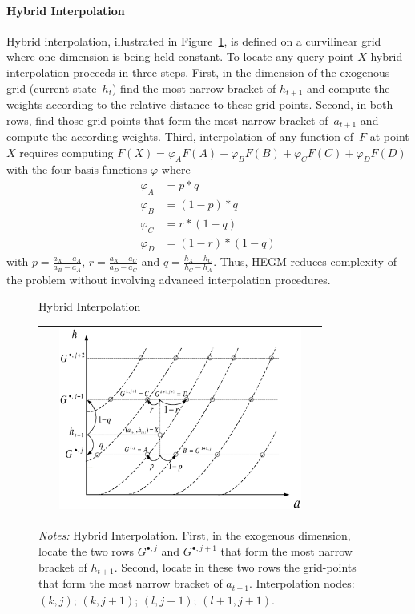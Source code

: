 \documentclass[a4paper,12pt]{article}
\begin{document}
\paragraph{Hybrid Interpolation}

Hybrid interpolation, illustrated in Figure~\ref{Hybrid interpolation}, is defined on a curvilinear grid where one dimension is being held constant. To locate any query point $X$ hybrid interpolation proceeds in three steps. First, in the dimension of the exogenous grid (current state~$h_{t}$) find the most narrow bracket of $h_{t+1}$ and compute the weights according to the relative distance to these grid-points. Second, in both rows, find those grid-points that form the most narrow bracket of~$a_{t+1}$ and compute the according weights. Third, interpolation of any function of~$F$ at point $X$ requires computing $F\left(X\right) = \varphi_{A} F(A) + \varphi_{B} F(B) + \varphi_{C} F(C) + \varphi_{D} F(D)$ with the four basis functions $\varphi$ where
\begin{align*}
	\varphi_{A}  &  = p \ast q  \\
	\varphi_{B}  &  = \left(1 - p\right) \ast q  \\
	\varphi_{C}  &  = r \ast \left(1 - q\right)  \\
	\varphi_{D}  &  = \left(1 - r\right) \ast \left(1 - q\right)
\end{align*}
with $p=\frac{a_{X} - a_{A}} {a_{B} - a_{A}}$, $r = \frac{a_{X} - a_{C}} {a_{D} - a_{C}}$ and $q = \frac{h_{X} - h_{C}} {h_{C} - h_{A}}$. Thus, HEGM reduces complexity of the problem without involving advanced interpolation procedures.

\begin{figure}[htb]
	\caption{Hybrid Interpolation}
	\label{Hybrid interpolation}
	\centering
	\begin{tabular}{c}
	\includegraphics[height=6.0cm, width=9.0cm]{Abbildungen/hybrid_3.eps}  \\
	\end{tabular}
	\caption*{\footnotesize{\emph{Notes:} Hybrid Interpolation. First, in the exogenous dimension, locate the two rows $G^{\bullet,j}$ and $G^{\bullet,j+1}$ that form the most narrow bracket of $h_{t+1}$. Second, locate in these two rows the grid-points that form the most narrow bracket of $a_{t+1}$. Interpolation nodes: $(k,j)$; $(k,j+1)$; $(l,j+1)$; $(l+1,j+1)$.}}
\end{figure}
\end{document}
